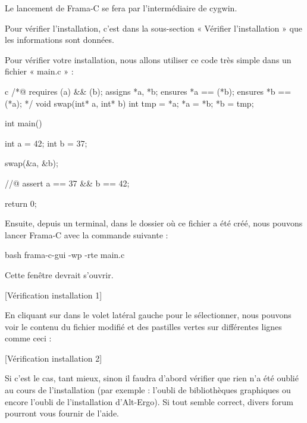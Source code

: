 \documentclass[middle]{zmdocument}
\begin{document}
Le lancement de Frama-C se fera par l'intermédiaire de cygwin.



Pour vérifier l'installation, c'est dans la sous-section « Vérifier l'installation »
que les informations sont données.





Pour vérifier votre installation, nous allons utiliser ce code très simple dans un 
fichier « main.c » :



\begin{CodeBlock}{c}
/*@
  requires \valid(a) && \valid(b);
  assigns *a, *b;
  ensures *a == \old(*b);
  ensures *b == \old(*a);
*/
void swap(int* a, int* b){
  int tmp = *a;
  *a = *b;
  *b = tmp;
}

int main(){
  int a = 42;
  int b = 37;

  swap(&a, &b);

  //@ assert a == 37 && b == 42;

  return 0;
}
\end{CodeBlock}



Ensuite, depuis un terminal, dans le dossier où ce fichier a été créé,
nous pouvons lancer Frama-C avec la commande suivante :



\begin{CodeBlock}{bash}
frama-c-gui -wp -rte main.c
\end{CodeBlock}



Cette fenêtre devrait s'ouvrir.



[Vérification installation 1]


En cliquant sur  dans le volet latéral gauche pour le sélectionner,
nous pouvons voir le contenu du fichier  modifié et des pastilles 
vertes sur différentes lignes comme ceci :



[Vérification installation 2]


Si c'est le cas, tant mieux, sinon il faudra d'abord vérifier que rien n'a été
oublié au cours de l'installation (par exemple : l'oubli de bibliothèques graphiques
ou encore l'oubli de l'installation d'Alt-Ergo). Si tout semble correct, divers forum
pourront vous fournir de l'aide.
\end{document}

